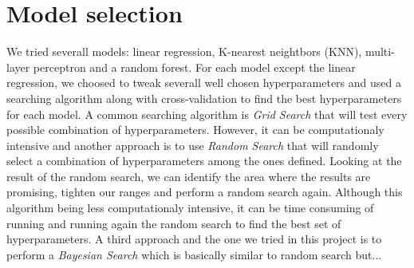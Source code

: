 \section{Model selection}

We tried severall models: linear regression, K-nearest neightbors (KNN), multi-layer perceptron and a random forest. For each model except the linear regression, we choosed to tweak severall well chosen hyperparameters and used a searching algorithm along with cross-validation to find the best hyperparameters for each model. A common searching algorithm is \textit{Grid Search} that will test every possible combination of hyperparameters. However, it can be computationaly intensive and another approach is to use \textit{Random Search} that will randomly select a combination of hyperparameters among the ones defined. Looking at the result of the random search, we can identify the area where the results are promising, tighten our ranges and perform a random search again. Although this algorithm being less computationaly intensive, it can be time consuming of running and running again the random search to find the best set of hyperparameters. A third approach and the one we tried in this project is to perform a \textit{Bayesian Search} which is basically similar to random search but...